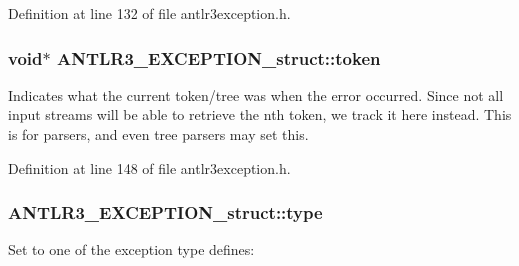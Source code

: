 Definition at line 132 of file antlr3exception.\-h.

\hypertarget{struct_a_n_t_l_r3___e_x_c_e_p_t_i_o_n__struct_affd710d1832c636583dfb691a327b3b2}{
\subsubsection[{token}]{\setlength{\rightskip}{0pt plus 5cm}void$\ast$ A\-N\-T\-L\-R3\-\_\-\-E\-X\-C\-E\-P\-T\-I\-O\-N\-\_\-struct\-::token}}\label{struct_a_n_t_l_r3___e_x_c_e_p_t_i_o_n__struct_affd710d1832c636583dfb691a327b3b2}
Indicates what the current token/tree was when the error occurred. Since not all input streams will be able to retrieve the nth token, we track it here instead. This is for parsers, and even tree parsers may set this. 

Definition at line 148 of file antlr3exception.\-h.

\hypertarget{struct_a_n_t_l_r3___e_x_c_e_p_t_i_o_n__struct_a3ffd8f9801f34b7168519896061233e1}{
\subsubsection[{type}]{ A\-N\-T\-L\-R3\-\_\-\-E\-X\-C\-E\-P\-T\-I\-O\-N\-\_\-struct\-::type}}\label{struct_a_n_t_l_r3___e_x_c_e_p_t_i_o_n__struct_a3ffd8f9801f34b7168519896061233e1}
Set to one of the exception type defines\-:


